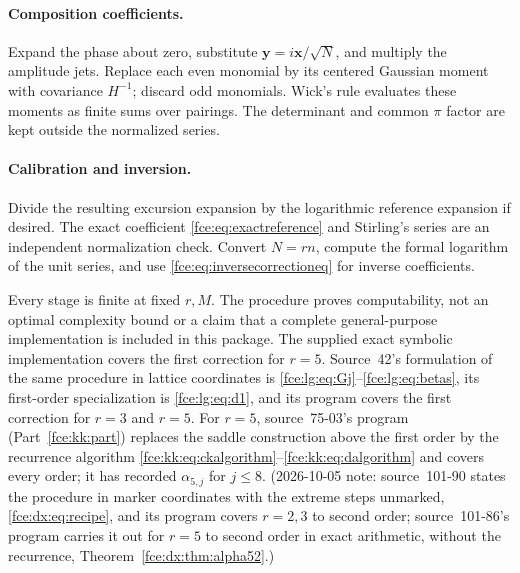 \documentclass[11pt,a4paper]{article}
\numberwithin{equation}{section}
\theoremstyle{definition}\newtheorem{definition}[theorem]{Definition}
\theoremstyle{remark}\newtheorem{remark}[theorem]{Remark}
\begin{document}
\paragraph{Composition coefficients.}
Expand the phase about zero, substitute
$\boldsymbol y=i\boldsymbol x/\sqrt N$, and multiply the amplitude jets.
Replace each even monomial by its centered Gaussian moment with covariance
$H^{-1}$; discard odd monomials. Wick's rule evaluates these moments as
finite sums over pairings. The determinant and common $\pi$ factor are
kept outside the normalized series.

\paragraph{Calibration and inversion.}
Divide the resulting excursion expansion by the logarithmic reference
expansion if desired. The exact coefficient \eqref{fce:eq:exactreference}
and Stirling's series are an independent normalization check. Convert
$N=rn$, compute the formal logarithm of the unit series, and use
\eqref{fce:eq:inversecorrectioneq} for inverse coefficients.

Every stage is finite at fixed $r,M$. The procedure proves computability,
not an optimal complexity bound or a claim that a complete general-purpose
implementation is included in this package. The supplied exact symbolic
implementation covers the first correction for $r=5$. Source~42's
formulation of the same procedure in lattice coordinates is
\eqref{fce:lg:eq:Gj}--\eqref{fce:lg:eq:betas}, its first-order
specialization is \eqref{fce:lg:eq:d1}, and its program covers the first
correction for $r=3$ and $r=5$. For $r=5$, source~75-03's program
(Part~\ref{fce:kk:part}) replaces the saddle construction above the first
order by the recurrence algorithm
\eqref{fce:kk:eq:ckalgorithm}--\eqref{fce:kk:eq:dalgorithm} and covers every
order; it has recorded $\alpha_{5,j}$ for $j\le8$. (2026-10-05 note: source~101-90 states the procedure in marker coordinates with the extreme
steps unmarked, \eqref{fce:dx:eq:recipe}, and its program covers $r=2,3$ to
second order; source~101-86's program carries it out for $r=5$ to second
order in exact arithmetic, without the recurrence,
Theorem~\ref{fce:dx:thm:alpha52}.)
\end{document}
